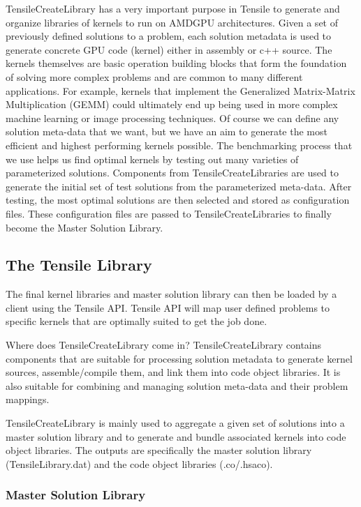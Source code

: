 \documentclass[]{article}
\begin{document}
TensileCreateLibrary has a very important purpose in Tensile to generate and organize libraries of kernels to run on AMDGPU architectures. Given a set of previously defined solutions to a problem, each solution metadata is used to generate concrete GPU code (kernel) either in assembly or c++ source. The kernels themselves are basic operation building blocks that form the foundation of solving more complex problems and are common to many different applications. For example, kernels that implement the Generalized Matrix-Matrix Multiplication (GEMM) could ultimately end up being used in more complex machine learning or image processing techniques. Of course we can define any solution meta-data that we want, but we have an aim to generate the most efficient and highest performing kernels possible. The benchmarking process that we use helps us find optimal kernels by testing out many varieties of parameterized solutions. Components from TensileCreateLibraries are used to generate the initial set of test solutions from the parameterized meta-data. After testing, the most optimal solutions are then selected and stored as configuration files. These configuration files are passed to TensileCreateLibraries to finally become the Master Solution Library.

\subsection{The Tensile Library}

The final kernel libraries and master solution library can then be loaded by a client using the Tensile API. Tensile API will map user defined problems to specific kernels that are optimally suited to get the job done.

Where does TensileCreateLibrary come in? TensileCreateLibrary contains components that are suitable for processing solution metadata to generate kernel sources, assemble/compile them, and link them into code object libraries. It is also suitable for combining and managing solution meta-data and their problem mappings.

TensileCreateLibrary is mainly used to aggregate a given set of solutions into a master solution library and to generate and bundle associated kernels into code object libraries. The outputs are specifically the master solution library (TensileLibrary.dat) and the code object libraries (.co/.hsaco).

\subsubsection{Master Solution Library}
\end{document}
